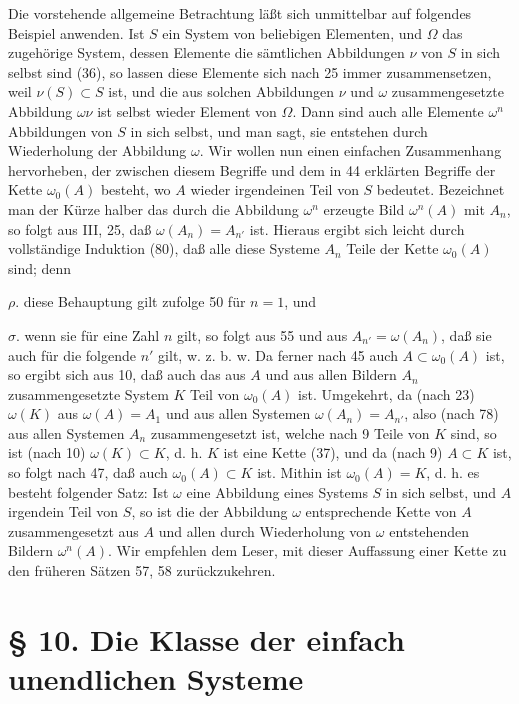 \documentclass[11pt]{article}
\newcommand{\partof}{\mathrel{\subset}}
\begin{document}
Die vorstehende allgemeine Betrachtung läßt sich unmittelbar auf folgendes Beispiel anwenden. Ist $S$ ein System von beliebigen Elementen, und $\Omega$ das zugehörige System, dessen Elemente die sämtlichen Abbildungen $\nu$ von $S$ in sich selbst sind (36), so lassen diese Elemente sich nach 25 immer zusammensetzen, weil $\nu(S)\partof S$ ist, und die aus solchen Abbildungen $\nu$ und $\omega$ zusammengesetzte Abbildung $\omega\nu$ ist selbst wieder Element von $\Omega$. Dann sind auch alle Elemente $\omega^n$ Abbildungen von $S$ in sich selbst, und man sagt, sie entstehen durch Wiederholung der Abbildung $\omega$. Wir wollen nun einen einfachen Zusammenhang hervorheben, der zwischen diesem Begriffe und dem in 44 erklärten Begriffe der Kette $\omega_0(A)$ besteht, wo $A$ wieder irgendeinen Teil von $S$ bedeutet. Bezeichnet man der Kürze halber das durch die Abbildung $\omega^n$ erzeugte Bild $\omega^n(A)$ mit $A_n$, so folgt aus III, 25, daß $\omega(A_n)=A_{n'}$ ist. Hieraus ergibt sich leicht durch vollständige Induktion (80), daß alle diese Systeme $A_n$ Teile der Kette $\omega_0(A)$ sind; denn

\noindent $\rho.$ diese Behauptung gilt zufolge 50 für $n=1$, und

\noindent $\sigma.$ wenn sie für eine Zahl $n$ gilt, so folgt aus 55 und aus $A_{n'}=\omega(A_n)$, daß sie auch für die folgende $n'$ gilt, w. z. b. w. Da ferner nach 45 auch $A\partof\omega_0(A)$ ist, so ergibt sich aus 10, daß auch das aus $A$ und aus allen Bildern $A_n$ zusammengesetzte System $K$ Teil von $\omega_0(A)$ ist. Umgekehrt, da (nach 23) $\omega(K)$ aus $\omega(A)=A_1$ und aus allen Systemen $\omega(A_n)=A_{n'}$, also (nach 78) aus allen Systemen $A_n$ zusammengesetzt ist, welche nach 9 Teile von $K$ sind, so ist (nach 10) $\omega(K)\partof K$, d. h. $K$ ist eine Kette (37), und da (nach 9) $A\partof K$ ist, so folgt nach 47, daß auch $\omega_0(A)\partof K$ ist. Mithin ist $\omega_0(A)=K$, d. h. es besteht folgender Satz: Ist $\omega$ eine Abbildung eines Systems $S$ in sich selbst, und $A$ irgendein Teil von $S$, so ist die der Abbildung $\omega$ entsprechende Kette von $A$ zusammengesetzt aus $A$ und allen durch Wiederholung von $\omega$ entstehenden Bildern $\omega^n(A)$. Wir empfehlen dem Leser, mit dieser Auffassung einer Kette zu den früheren Sätzen 57, 58 zurückzukehren.

\section*{\S{} 10. Die Klasse der einfach unendlichen Systeme}
\end{document}
